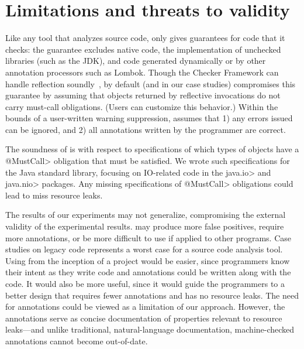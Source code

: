 \section{Limitations and threats to validity}
\label{sec:threats}

Like any tool that analyzes source code, \tool only
gives guarantees for code that it checks: the guarantee
excludes native code, the implementation of unchecked libraries (such as the JDK),
and code generated dynamically or by other annotation processors
such as Lombok.
Though
the Checker Framework can handle 
reflection soundly~\cite{BarrosJMVDdAE2015}, by default (and in our case studies)
\tool compromises this guarantee
by assuming that objects returned by reflective invocations
do not carry must-call obligations.  (Users can customize this behavior.)
Within the bounds
of a user-written warning suppression, \tool assumes that 1)
any errors issued can be ignored, and 2) all annotations
written by the programmer are correct.

The soundness of
\tool is with respect to specifications of which types of objects have a
\<@MustCall> obligation that must be satisfied.  We wrote such specifications
for the Java standard library, focusing on IO-related code in the \<java.io> and
\<java.nio> packages.  Any missing specifications of \<@MustCall> obligations
could lead \tool to miss resource leaks.

The results of our experiments may not generalize, compromising the
external validity of the experimental results.
\Tool may produce more false positives, require
more annotations, or be more difficult to use if applied to other
programs.
Case studies on legacy code represents a worst case for a source code
analysis tool.  Using \tool from
the inception of a project would be easier, since programmers know their
intent as they write code and annotations could be written along with the
code.  It would also be more useful, since it would guide the programmers
to a better design that requires fewer annotations and has no resource leaks.
The need for annotations could be viewed as a limitation of our approach.
However, the annotations serve as concise documentation of
properties relevant to resource leaks---and unlike traditional, natural-language
documentation, machine-checked annotations cannot become out-of-date.

